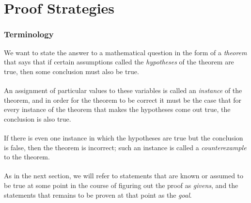 \documentclass{report}
\theoremstyle{definition}
\begin{document}
\chapter{Proof Strategies}
\subsection{Terminology}
We want to state the answer to a mathematical question in the form of a \textit{theorem} that says that if certain assumptions called the \textit{hypotheses} of the theorem are true, then
some conclusion must also be true.\\
\vspace{1mm}\\
An assignment of particular values to these variables is called an \textit{instance} of the theorem, and in order for the theorem to be correct it must be the case
that for every instance of the theorem that makes the hypotheses come out true, the conclusion is also true.\\
\vspace{1mm}\\
If there is even one instance
in which the hypotheses are true but the conclusion is false, then the theorem is incorrect; such an instance is called a \textit{counterexample} to the theorem.\\
\vspace{1mm}\\
As in the next section, we will refer to statements that are known or assumed to be true at some point in the course of figuring out the proof as \textit{givens}, and the statements that remains
to be proven at that point as the \textit{goal}.
\newpage
\end{document}
